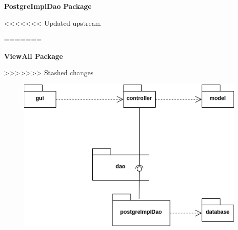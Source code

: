 \newpage

\begin{center}
	\textbf{PostgreImplDao Package}
\end{center}
<<<<<<< Updated upstream

\begin{figure}[h]
	
\end{figure}
=======
\bigskip


%	

\newpage

\bigskip
\begin{center}
	\textbf{ViewAll Package}
\end{center}
\bigskip

>>>>>>> Stashed changes

\newpage

\begin{center}
\end{center}

\begin{figure}[h]
	\includegraphics{res/DOC_OBJECT/onlyPackage.png}
\end{figure}






